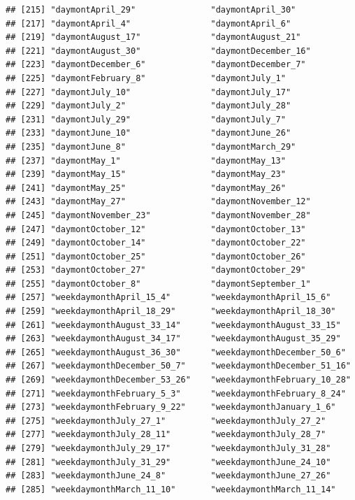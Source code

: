 \documentclass[
]{article}
\begin{document}
\begin{verbatim}
## [215] "daymontApril_29"               "daymontApril_30"              
## [217] "daymontApril_4"                "daymontApril_6"               
## [219] "daymontAugust_17"              "daymontAugust_21"             
## [221] "daymontAugust_30"              "daymontDecember_16"           
## [223] "daymontDecember_6"             "daymontDecember_7"            
## [225] "daymontFebruary_8"             "daymontJuly_1"                
## [227] "daymontJuly_10"                "daymontJuly_17"               
## [229] "daymontJuly_2"                 "daymontJuly_28"               
## [231] "daymontJuly_29"                "daymontJuly_7"                
## [233] "daymontJune_10"                "daymontJune_26"               
## [235] "daymontJune_8"                 "daymontMarch_29"              
## [237] "daymontMay_1"                  "daymontMay_13"                
## [239] "daymontMay_15"                 "daymontMay_23"                
## [241] "daymontMay_25"                 "daymontMay_26"                
## [243] "daymontMay_27"                 "daymontNovember_12"           
## [245] "daymontNovember_23"            "daymontNovember_28"           
## [247] "daymontOctober_12"             "daymontOctober_13"            
## [249] "daymontOctober_14"             "daymontOctober_22"            
## [251] "daymontOctober_25"             "daymontOctober_26"            
## [253] "daymontOctober_27"             "daymontOctober_29"            
## [255] "daymontOctober_8"              "daymontSeptember_1"           
## [257] "weekdaymonthApril_15_4"        "weekdaymonthApril_15_6"       
## [259] "weekdaymonthApril_18_29"       "weekdaymonthApril_18_30"      
## [261] "weekdaymonthAugust_33_14"      "weekdaymonthAugust_33_15"     
## [263] "weekdaymonthAugust_34_17"      "weekdaymonthAugust_35_29"     
## [265] "weekdaymonthAugust_36_30"      "weekdaymonthDecember_50_6"    
## [267] "weekdaymonthDecember_50_7"     "weekdaymonthDecember_51_16"   
## [269] "weekdaymonthDecember_53_26"    "weekdaymonthFebruary_10_28"   
## [271] "weekdaymonthFebruary_5_3"      "weekdaymonthFebruary_8_24"    
## [273] "weekdaymonthFebruary_9_22"     "weekdaymonthJanuary_1_6"      
## [275] "weekdaymonthJuly_27_1"         "weekdaymonthJuly_27_2"        
## [277] "weekdaymonthJuly_28_11"        "weekdaymonthJuly_28_7"        
## [279] "weekdaymonthJuly_29_17"        "weekdaymonthJuly_31_28"       
## [281] "weekdaymonthJuly_31_29"        "weekdaymonthJune_24_10"       
## [283] "weekdaymonthJune_24_8"         "weekdaymonthJune_27_26"       
## [285] "weekdaymonthMarch_11_10"       "weekdaymonthMarch_11_14"      

\end{verbatim}
\end{document}
